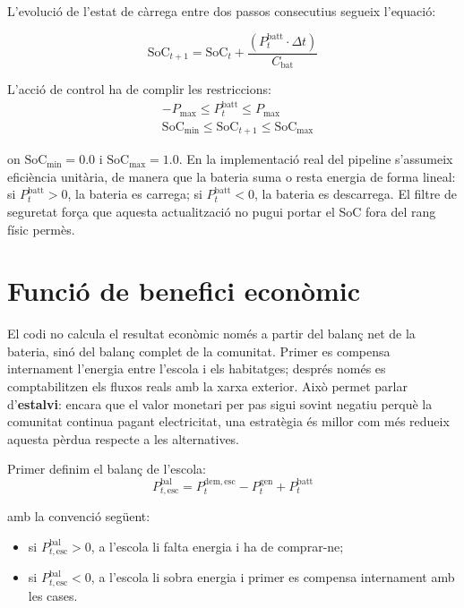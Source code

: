 \documentclass[a4paper,12pt,twoside]{ThesisStyle}
\begin{document}
L'evolució de l'estat de càrrega entre dos passos consecutius segueix l'equació:

\begin{equation}
  \mathrm{SoC}_{t+1} = \mathrm{SoC}_t + \frac{\left(P_t^{\mathrm{batt}} \cdot \Delta t\right)}{C_{\mathrm{bat}}}
  \label{eq:batt_dynamics}
\end{equation}

L'acció de control ha de complir les restriccions:
\begin{align}
    &-P_{\mathrm{max}} \leq P_t^{\mathrm{batt}} \leq P_{\mathrm{max}} \label{eq:power_limit} \\
    &\mathrm{SoC}_{\min} \leq \mathrm{SoC}_{t+1} \leq \mathrm{SoC}_{\max} \label{eq:soc_limit}
\end{align}

on $\mathrm{SoC}_{\min} = 0.0$ i $\mathrm{SoC}_{\max} = 1.0$. En la implementació real del pipeline s'assumeix eficiència unitària, de manera que la bateria suma o resta energia de forma lineal: si $P_t^{\mathrm{batt}} > 0$, la bateria es carrega; si $P_t^{\mathrm{batt}} < 0$, la bateria es descarrega. El filtre de seguretat força que aquesta actualització no pugui portar el SoC fora del rang físic permès.

\section{Funció de benefici econòmic}

El codi no calcula el resultat econòmic només a partir del balanç net de la bateria, sinó del balanç complet de la comunitat. Primer es compensa internament l'energia entre l'escola i els habitatges; després només es comptabilitzen els fluxos reals amb la xarxa exterior. Això permet parlar d'\textbf{estalvi}: encara que el valor monetari per pas sigui sovint negatiu perquè la comunitat continua pagant electricitat, una estratègia és millor com més redueix aquesta pèrdua respecte a les alternatives.

Primer definim el balanç de l'escola:
\begin{equation}
  P_{t,\mathrm{esc}}^{\mathrm{bal}} = P_t^{\mathrm{dem,esc}} - P_t^{\mathrm{gen}} + P_t^{\mathrm{batt}}
\end{equation}

amb la convenció següent:
\begin{itemize}
  \item si $P_{t,\mathrm{esc}}^{\mathrm{bal}} > 0$, a l'escola li falta energia i ha de comprar-ne;
  \item si $P_{t,\mathrm{esc}}^{\mathrm{bal}} < 0$, a l'escola li sobra energia i primer es compensa internament amb les cases.
\end{itemize}
\end{document}
